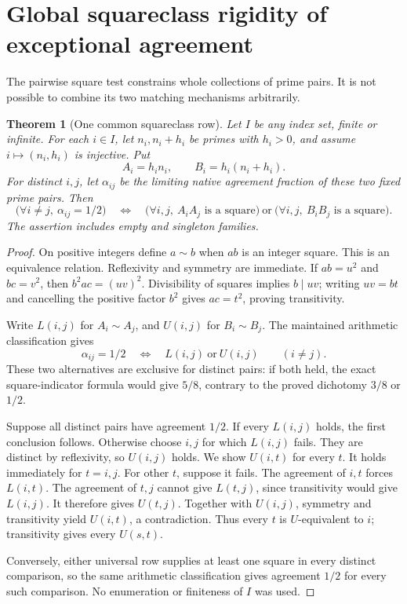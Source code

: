 \documentclass[11pt]{article}
\newtheorem{theorem}{Theorem}[section]
\begin{document}
\section{Global squareclass rigidity of exceptional agreement}
\label{sec:native-agreement-geometry}

The pairwise square test constrains whole collections of prime pairs.
It is not possible to combine its two matching mechanisms arbitrarily.

\begin{theorem}[One common squareclass row]
\label{thm:native-agreement-geometry}
Let \(I\) be any index set, finite or infinite. For each \(i\in I\),
let \(n_i,n_i+h_i\) be primes with \(h_i>0\), and assume
\(i\mapsto(n_i,h_i)\) is injective. Put
\[
 A_i=h_i n_i,\qquad B_i=h_i(n_i+h_i).
\]
For distinct \(i,j\), let \(\alpha_{ij}\) be the limiting native
agreement fraction of these two fixed prime pairs. Then
\[
 \boxed{
 \bigl(\forall i\ne j,\ \alpha_{ij}=1/2\bigr)
 \quad\Longleftrightarrow\quad
 \bigl(\forall i,j,\ A_iA_j\text{ is a square}\bigr)
 \ \text{or}\
 \bigl(\forall i,j,\ B_iB_j\text{ is a square}\bigr).
 }
\]
The assertion includes empty and singleton families.
\end{theorem}

\begin{proof}
On positive integers define \(a\sim b\) when \(ab\) is an integer
square. This is an equivalence relation. Reflexivity and symmetry
are immediate. If \(ab=u^2\) and \(bc=v^2\), then
\(b^2ac=(uv)^2\). Divisibility of squares implies \(b\mid uv\);
writing \(uv=bt\) and cancelling the positive factor \(b^2\)
gives \(ac=t^2\), proving transitivity.

Write \(L(i,j)\) for \(A_i\sim A_j\), and \(U(i,j)\) for
\(B_i\sim B_j\). The maintained arithmetic classification gives
\[
 \alpha_{ij}=1/2\quad\Longleftrightarrow\quad
 L(i,j)\ \text{or}\ U(i,j)\qquad(i\ne j).
\]
These two alternatives are exclusive for distinct pairs: if both
held, the exact square-indicator formula would give \(5/8\),
contrary to the proved dichotomy \(3/8\) or \(1/2\).

Suppose all distinct pairs have agreement \(1/2\). If every
\(L(i,j)\) holds, the first conclusion follows. Otherwise choose
\(i,j\) for which \(L(i,j)\) fails. They are distinct by reflexivity,
so \(U(i,j)\) holds. We show \(U(i,t)\) for every \(t\).
It holds immediately for \(t=i,j\). For other \(t\), suppose it
fails. The agreement of \(i,t\) forces \(L(i,t)\).
The agreement of \(t,j\) cannot give \(L(t,j)\), since transitivity
would give \(L(i,j)\). It therefore gives \(U(t,j)\).
Together with \(U(i,j)\), symmetry and transitivity yield \(U(i,t)\),
a contradiction. Thus every \(t\) is \(U\)-equivalent to \(i\);
transitivity gives every \(U(s,t)\).

Conversely, either universal row supplies at least one square
in every distinct comparison, so the same arithmetic classification
gives agreement \(1/2\) for every such comparison.
No enumeration or finiteness of \(I\) was used.
\end{proof}
\end{document}
